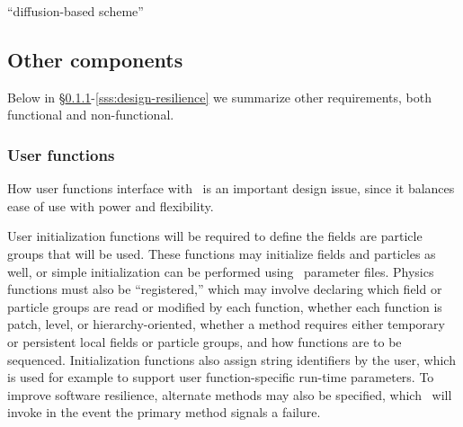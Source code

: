 \documentclass[10pt,twocolumn]{article}
\begin{document}

``diffusion-based scheme''

% 

\subsection{Other components} \label{ss:design-other}


Below in \S\ref{sss:design-user}-\ref{sss:design-resilience} we
summarize other requirements, both functional and non-functional.

\subsubsection{User functions} \label{sss:design-user}

How user functions interface with \cello\ is an important design
issue, since it balances ease of use with power and flexibility.  

User initialization functions will be required to define the fields
are particle groups that will be used.  These functions may initialize
fields and particles as well, or simple initialization can be
performed using \cello\ parameter files.  Physics functions must also
be ``registered,'' which may involve declaring which field or particle
groups are read or modified by each function, whether each function is
patch, level, or hierarchy-oriented, whether a method requires
either temporary or persistent local fields or particle groups, and
how functions are to be sequenced.  Initialization functions also
assign string identifiers by the user, which is used for example to
support user function-specific run-time parameters.  To improve
software resilience, alternate methods may also be specified, which
\cello\ will invoke in the event the primary method signals a failure.
\end{document}
